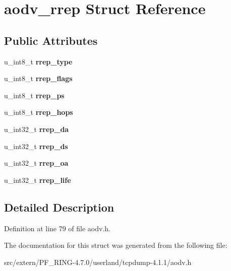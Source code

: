 \hypertarget{structaodv__rrep}{
\section{aodv\_\-rrep Struct Reference}
\label{structaodv__rrep}
}
\subsection*{Public Attributes}
\begin{DoxyCompactItemize}
\item 
\hypertarget{structaodv__rrep_a5dad8bad7fd2a4d10e97005d5ffbcb24}{
u\_\-int8\_\-t {\bfseries rrep\_\-type}}
\label{structaodv__rrep_a5dad8bad7fd2a4d10e97005d5ffbcb24}

\item 
\hypertarget{structaodv__rrep_a9d8d17798198e23fc8dcb07eae1bccc7}{
u\_\-int8\_\-t {\bfseries rrep\_\-flags}}
\label{structaodv__rrep_a9d8d17798198e23fc8dcb07eae1bccc7}

\item 
\hypertarget{structaodv__rrep_a6581da668fa981792b8be1a4bf9c2f03}{
u\_\-int8\_\-t {\bfseries rrep\_\-ps}}
\label{structaodv__rrep_a6581da668fa981792b8be1a4bf9c2f03}

\item 
\hypertarget{structaodv__rrep_a1ed3d15dfbaf63ac3f1b281c758ee49a}{
u\_\-int8\_\-t {\bfseries rrep\_\-hops}}
\label{structaodv__rrep_a1ed3d15dfbaf63ac3f1b281c758ee49a}

\item 
\hypertarget{structaodv__rrep_a3827e506d901918628badee9e976465d}{
u\_\-int32\_\-t {\bfseries rrep\_\-da}}
\label{structaodv__rrep_a3827e506d901918628badee9e976465d}

\item 
\hypertarget{structaodv__rrep_aae731f72cf1585e659b6e0f988a2543d}{
u\_\-int32\_\-t {\bfseries rrep\_\-ds}}
\label{structaodv__rrep_aae731f72cf1585e659b6e0f988a2543d}

\item 
\hypertarget{structaodv__rrep_a04ca0a1c0c1d3f447e9d4df46ea3dde0}{
u\_\-int32\_\-t {\bfseries rrep\_\-oa}}
\label{structaodv__rrep_a04ca0a1c0c1d3f447e9d4df46ea3dde0}

\item 
\hypertarget{structaodv__rrep_a0d2cb7916a4a2e2f8bb502a28badbd60}{
u\_\-int32\_\-t {\bfseries rrep\_\-life}}
\label{structaodv__rrep_a0d2cb7916a4a2e2f8bb502a28badbd60}

\end{DoxyCompactItemize}


\subsection{Detailed Description}


Definition at line 79 of file aodv.h.



The documentation for this struct was generated from the following file:\begin{DoxyCompactItemize}
\item 
src/extern/PF\_\-RING-\/4.7.0/userland/tcpdump-\/4.1.1/aodv.h\end{DoxyCompactItemize}
